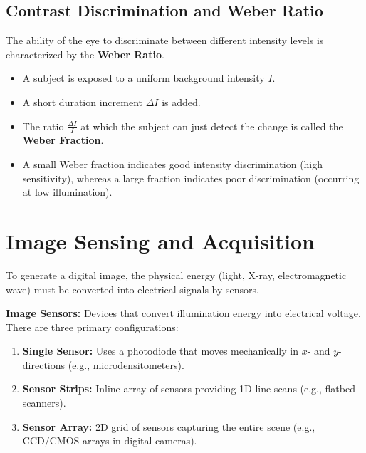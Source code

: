 \documentclass[12pt,a4paper]{article}
\begin{document}
\subsection{Contrast Discrimination and Weber Ratio}
The ability of the eye to discriminate between different intensity levels is characterized by the \textbf{Weber Ratio}.
\begin{itemize}[leftmargin=*, itemsep=3pt]
  \item A subject is exposed to a uniform background intensity $I$.
  \item A short duration increment $\Delta I$ is added.
  \item The ratio $\frac{\Delta I}{I}$ at which the subject can just detect the change is called the \textbf{Weber Fraction}.
  \item A small Weber fraction indicates good intensity discrimination (high sensitivity), whereas a large fraction indicates poor discrimination (occurring at low illumination).
\end{itemize}

\section{Image Sensing and Acquisition}

To generate a digital image, the physical energy (light, X-ray, electromagnetic wave) must be converted into electrical signals by sensors.

\begin{tcolorbox}[defbox, title={Image Sensor Configurations}]
\textbf{Image Sensors:} Devices that convert illumination energy into electrical voltage. There are three primary configurations:
\begin{enumerate}[label=(\alph*), leftmargin=*, itemsep=1pt]
  \item \textbf{Single Sensor:} Uses a photodiode that moves mechanically in $x$- and $y$-directions (e.g., microdensitometers).
  \item \textbf{Sensor Strips:} Inline array of sensors providing 1D line scans (e.g., flatbed scanners).
  \item \textbf{Sensor Array:} 2D grid of sensors capturing the entire scene (e.g., CCD/CMOS arrays in digital cameras).
\end{enumerate}
\end{tcolorbox}
\end{document}
